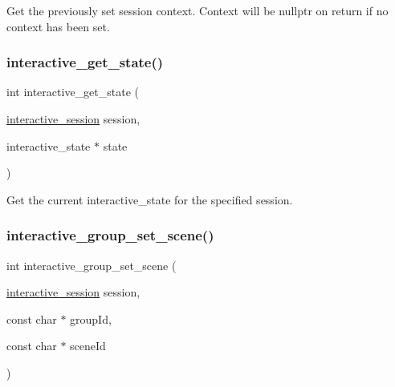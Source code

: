 Get the previously set session context. Context will be nullptr on return if no context has been set. 

\mbox{\label{group___interactivity_ga9ac2284b559712581d921ff437cd0a02}} 
\subsubsection{\texorpdfstring{interactive\+\_\+get\+\_\+state()}{interactive\_get\_state()}}
{\footnotesize\ttfamily int interactive\+\_\+get\+\_\+state (\begin{DoxyParamCaption}\item[{\mbox{\hyperlink{group___interactivity_ga6d8819d38b8dc8994a2299cf22a65a31}{interactive\+\_\+session}}}]{session,  }\item[{interactive\+\_\+state $\ast$}]{state }\end{DoxyParamCaption})}



Get the current {\ttfamily interactive\+\_\+state} for the specified session. 

\mbox{\label{group___interactivity_gadc0bc428c8fc8027353f9936fb018a57}} 
\subsubsection{\texorpdfstring{interactive\+\_\+group\+\_\+set\+\_\+scene()}{interactive\_group\_set\_scene()}}
{\footnotesize\ttfamily int interactive\+\_\+group\+\_\+set\+\_\+scene (\begin{DoxyParamCaption}\item[{\mbox{\hyperlink{group___interactivity_ga6d8819d38b8dc8994a2299cf22a65a31}{interactive\+\_\+session}}}]{session,  }\item[{const char $\ast$}]{group\+Id,  }\item[{const char $\ast$}]{scene\+Id }\end{DoxyParamCaption})}



